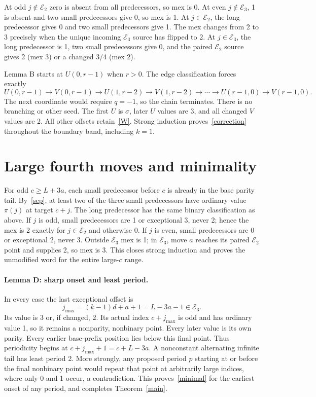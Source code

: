 \documentclass[10pt,a4paper]{article}
\newcommand{\E}{\mathcal E}
\newcommand{\p}{\pi}
\begin{document}
At odd $j\notin\E_2$ zero is absent from all predecessors, so mex is 0. At even $j\notin\E_3$, 1 is absent and two small predecessors give 0, so mex is 1. At $j\in\E_2$, the long predecessor gives 0 and two small predecessors give 1. The mex changes from 2 to 3 precisely when the unique incoming $\E_3$ source has flipped to 2. At $j\in\E_3$, the long predecessor is 1, two small predecessors give 0, and the paired $\E_2$ source gives 2 (mex 3) or a changed 3/4 (mex 2).

Lemma B starts at $U(0,r-1)$ when $r>0$. The edge classification forces exactly
\[
 U(0,r-1)\to V(0,r-1)\to U(1,r-2)\to V(1,r-2)\to\cdots\to U(r-1,0)\to V(r-1,0).
\]
The next coordinate would require $q=-1$, so the chain terminates. There is no branching or other seed. The first $U$ is $\sigma$, later $U$ values are 3, and all changed $V$ values are 2. All other offsets retain~\eqref{W}. Strong induction proves~\eqref{correction} throughout the boundary band, including $k=1$.

\section{Large fourth moves and minimality}
For odd $c\ge L+3a$, each small predecessor before $c$ is already in the base parity tail. By~\eqref{sep}, at least two of the three small predecessors have ordinary value $\p(j)$ at target $c+j$. The long predecessor has the same binary classification as above. If $j$ is odd, small predecessors are 1 or exceptional 3, never 2; hence the mex is 2 exactly for $j\in\E_2$ and otherwise 0. If $j$ is even, small predecessors are 0 or exceptional 2, never 3. Outside $\E_3$ mex is 1; in $\E_3$, move $a$ reaches its paired $\E_2$ point and supplies 2, so mex is 3. This closes strong induction and proves the unmodified word for the entire large-$c$ range.

\paragraph{Lemma D: sharp onset and least period.}
In every case the last exceptional offset is
\begin{equation}\label{last}
 j_{\max}=(k-1)d+a+1=L-3a-1\in\E_3.
\end{equation}
Its value is 3 or, if changed, 2. Its actual index $c+j_{\max}$ is odd and has ordinary value 1, so it remains a nonparity, nonbinary point. Every later value is its own parity. Every earlier base-prefix position lies below this final point. Thus periodicity begins at $c+j_{\max}+1=c+L-3a$. A nonconstant alternating infinite tail has least period 2. More strongly, any proposed period $p$ starting at or before the final nonbinary point would repeat that point at arbitrarily large indices, where only 0 and 1 occur, a contradiction. This proves~\eqref{minimal} for the earliest onset of any period, and completes Theorem~\ref{main}.
\end{document}
